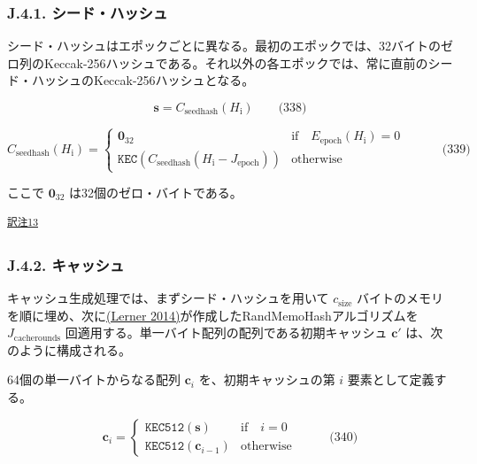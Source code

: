 \documentclass[
]{ltjsarticle}
\begin{document}
\hypertarget{j.4.1.-ux30b7ux30fcux30c9ux30cfux30c3ux30b7ux30e5}{%
\subsubsection{J.4.1.
シード・ハッシュ}\label{j.4.1.-ux30b7ux30fcux30c9ux30cfux30c3ux30b7ux30e5}}

シード・ハッシュはエポックごとに異なる。最初のエポックでは、32バイトのゼロ列のKeccak-256ハッシュである。それ以外の各エポックでは、常に直前のシード・ハッシュのKeccak-256ハッシュとなる。

\protect\hypertarget{eq-338}{}{}

\[\mathbf{s} = C_{\mathrm{seedhash}}(H_{\mathrm{i}}) \qquad \text{(338)}\]

\protect\hypertarget{eq-339}{}{}

\[C_{\mathrm{seedhash}}(H_{\mathrm{i}}) = \begin{cases}
\mathbf{0}_{32} & \text{if} \quad E_{\mathrm{epoch}}(H_{\mathrm{i}}) = 0 \quad  \\
\texttt{KEC}(C_{\mathrm{seedhash}}(H_{\mathrm{i}} - J_{\mathrm{epoch}})) & \text{otherwise}
\end{cases} \qquad \text{(339)}\]

ここで \(\mathbf{0}_{32}\) は32個のゼロ・バイトである。

\protect\hypertarget{tnref-13}{}{}\textsuperscript{\protect\hyperlink{tn-13}{訳注13}}

\hypertarget{j.4.2.-ux30adux30e3ux30c3ux30b7ux30e5}{%
\subsubsection{J.4.2.
キャッシュ}\label{j.4.2.-ux30adux30e3ux30c3ux30b7ux30e5}}

キャッシュ生成処理では、まずシード・ハッシュを用いて
\(c_{\mathrm{size}}\)
バイトのメモリを順に埋め、次に\protect\hyperlink{ref-lerner2014randmemohash}{(Lerner
2014)}が作成したRandMemoHashアルゴリズムを \(J_{\mathrm{cacherounds}}\)
回適用する。単一バイト配列の配列である初期キャッシュ \(\mathbf{c'}\)
は、次のように構成される。

64個の単一バイトからなる配列 \(\mathbf{c}_{i}\) を、初期キャッシュの第
\(i\) 要素として定義する。

\protect\hypertarget{eq-340}{}{}

\[\mathbf{c}_{i} = \begin{cases}
\texttt{KEC512}(\mathbf{s}) & \text{if} \quad i = 0 \quad  \\
\texttt{KEC512}(\mathbf{c}_{i-1}) & \text{otherwise}
\end{cases} \qquad \text{(340)}\]
\end{document}
